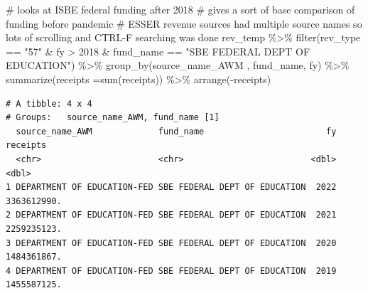 \documentclass[
  letterpaper,
  DIV=11,
  numbers=noendperiod]{scrreport}
\newenvironment{Shaded}{\begin{snugshade}}{\end{snugshade}}
\newcommand{\AttributeTok}[1]{\textcolor[rgb]{0.40,0.45,0.13}{#1}}
\newcommand{\CommentTok}[1]{\textcolor[rgb]{0.37,0.37,0.37}{#1}}
\newcommand{\DecValTok}[1]{\textcolor[rgb]{0.68,0.00,0.00}{#1}}
\newcommand{\FunctionTok}[1]{\textcolor[rgb]{0.28,0.35,0.67}{#1}}
\newcommand{\NormalTok}[1]{\textcolor[rgb]{0.00,0.23,0.31}{#1}}
\newcommand{\SpecialCharTok}[1]{\textcolor[rgb]{0.37,0.37,0.37}{#1}}
\newcommand{\StringTok}[1]{\textcolor[rgb]{0.13,0.47,0.30}{#1}}
\begin{document}
\begin{Shaded}
\begin{Highlighting}[]
\CommentTok{\# looks at ISBE federal funding after 2018}
\CommentTok{\# gives a sort of base comparison of funding before pandemic}
\CommentTok{\# ESSER revenue sources had multiple source names so lots of scrolling and CTRL{-}F searching was done}
\NormalTok{rev\_temp }\SpecialCharTok{\%\textgreater{}\%} 
  \FunctionTok{filter}\NormalTok{(rev\_type }\SpecialCharTok{==} \StringTok{"57"} \SpecialCharTok{\&}\NormalTok{ fy }\SpecialCharTok{\textgreater{}} \DecValTok{2018} \SpecialCharTok{\&}\NormalTok{ fund\_name }\SpecialCharTok{==} \StringTok{"SBE FEDERAL DEPT OF EDUCATION"}\NormalTok{) }\SpecialCharTok{\%\textgreater{}\%}
  \FunctionTok{group\_by}\NormalTok{(source\_name\_AWM , fund\_name, fy) }\SpecialCharTok{\%\textgreater{}\%} 
  \FunctionTok{summarize}\NormalTok{(}\AttributeTok{receipts =}\FunctionTok{sum}\NormalTok{(receipts)) }\SpecialCharTok{\%\textgreater{}\%} 
  \FunctionTok{arrange}\NormalTok{(}\SpecialCharTok{{-}}\NormalTok{receipts)}
\end{Highlighting}
\end{Shaded}

\begin{verbatim}
# A tibble: 4 x 4
# Groups:   source_name_AWM, fund_name [1]
  source_name_AWM             fund_name                        fy    receipts
  <chr>                       <chr>                         <dbl>       <dbl>
1 DEPARTMENT OF EDUCATION-FED SBE FEDERAL DEPT OF EDUCATION  2022 3363612990.
2 DEPARTMENT OF EDUCATION-FED SBE FEDERAL DEPT OF EDUCATION  2021 2259235123.
3 DEPARTMENT OF EDUCATION-FED SBE FEDERAL DEPT OF EDUCATION  2020 1484361867.
4 DEPARTMENT OF EDUCATION-FED SBE FEDERAL DEPT OF EDUCATION  2019 1455587125.
\end{verbatim}
\end{document}
